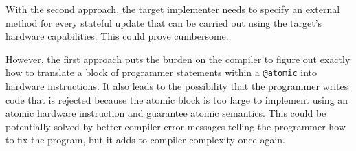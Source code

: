 With the second approach, the target implementer needs to specify an external
method for every stateful update that can be carried out using the target's
hardware capabilities. This could prove cumbersome.

 However, the first approach puts the burden on the compiler to figure out
exactly how to translate a block of programmer statements within a
\texttt{@atomic} into hardware instructions. It also leads to the possibility
that the programmer writes code that is rejected because the atomic block is
too large to implement using an atomic hardware instruction and guarantee
atomic semantics. This could be potentially solved by better compiler error
messages telling the programmer how to fix the program, but it adds to compiler
complexity once again.
